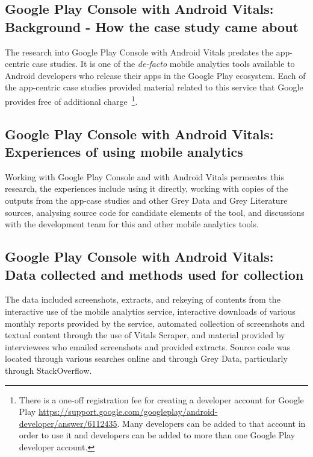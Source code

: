 



\subsection{Google Play Console with Android Vitals: Background - How the case study came about}
The research into Google Play Console with Android Vitals predates the app-centric case studies. It is one of the \emph{de-facto} mobile analytics tools available to Android developers who release their apps in the Google Play ecosystem. Each of the app-centric case studies provided material related to this service that Google provides free of additional charge~\footnote{There is a one-off registration fee for creating a developer account for Google Play \url{https://support.google.com/googleplay/android-developer/answer/6112435}. Many developers can be added to that account in order to use it and developers can be added to more than one Google Play developer account.}.

\subsection{Google Play Console with Android Vitals: Experiences of using mobile analytics}
Working with Google Play Console and with Android Vitals permeates this research, the experiences include using it directly, working with copies of the outputs from the app-case studies and other Grey Data and Grey Literature sources, analysing source code for candidate elements of the tool, and discussions with the development team for this and other mobile analytics tools.

\subsection{Google Play Console with Android Vitals: Data collected and methods used for collection}
The data included screenshots, extracts, and rekeying of contents from the interactive use of the mobile analytics service, interactive downloads of various monthly reports provided by the service, automated collection of screenshots and textual content through the use of Vitals Scraper, and material provided by interviewees who emailed screenshots and provided extracts. Source code was located through various searches online and through Grey Data, particularly through StackOverflow. 


